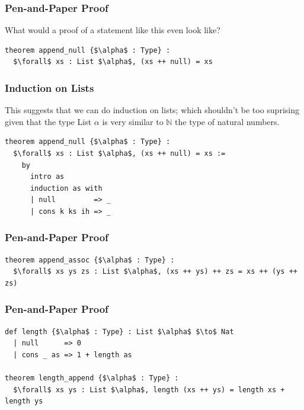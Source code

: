 \documentclass{beamer}
\theoremstyle{indentDefn} \newtheorem{defn}[]{Definition}
\begin{document}
\begin{frame}[fragile]
	\frametitle{Pen-and-Paper Proof}
	
	What would a proof of a statement like this even look like? 	
	\begin{lstlisting}[language=Lean]
theorem append_null {$\alpha$ : Type} :
  $\forall$ xs : List $\alpha$, (xs ++ null) = xs
	\end{lstlisting}
	
	\vspace{50mm}
	
\end{frame}

\begin{frame}[fragile]
	\frametitle{Induction on Lists}
	
	This suggests that we can do induction on lists; which shouldn't be too suprising given that the type List $\alpha$ is very similar to $\mathbb{N}$ the type of natural numbers.
	
	\begin{lstlisting}[language=Lean]
theorem append_null {$\alpha$ : Type} :
  $\forall$ xs : List $\alpha$, (xs ++ null) = xs :=
    by
      intro as
      induction as with
      | null         => _
      | cons k ks ih => _
	\end{lstlisting}

\vspace{30mm}	
\end{frame}

\begin{frame}[fragile]
	\frametitle{Pen-and-Paper Proof}
		
	\begin{lstlisting}[language=Lean]
theorem append_assoc {$\alpha$ : Type} :
  $\forall$ xs ys zs : List $\alpha$, (xs ++ ys) ++ zs = xs ++ (ys ++ zs)
	\end{lstlisting}
	
	\vspace{60mm}
	
\end{frame}

\begin{frame}[fragile]
	\frametitle{Pen-and-Paper Proof}
		
	\begin{lstlisting}[language=Lean]
def length {$\alpha$ : Type} : List $\alpha$ $\to$ Nat
  | null      => 0
  | cons _ as => 1 + length as

theorem length_append {$\alpha$ : Type} :
  $\forall$ xs ys : List $\alpha$, length (xs ++ ys) = length xs + length ys
	\end{lstlisting}
	
	\vspace{60mm}
	
\end{frame}
\end{document}
